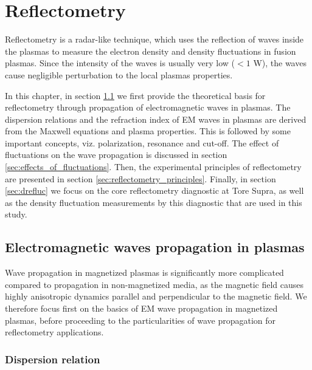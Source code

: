 
\chapter{Reflectometry} \label{ch:Reflectometry}
\graphicspath{{chapter3_ys/}}
\minitoc


Reflectometry is a radar-like technique, which uses the reflection of waves inside the plasmas to measure the electron density and density fluctuations in fusion plasmas. Since the intensity of the waves is usually very low ($< 1$ W), the waves cause negligible perturbation to the local plasmas properties.

In this chapter, in section \ref{sec:EM_waves_propagation} we first provide the theoretical basis for reflectometry through propagation of electromagnetic waves in plasmas. The dispersion relations and the refraction index of EM waves in plasmas are derived from the Maxwell equations and plasma properties. This is followed by some important concepts, viz. polarization, resonance and cut-off. The effect of fluctuations on the wave propagation is discussed in section \ref{sec:effects_of_fluctuations}. Then, the experimental principles of reflectometry are presented in section \ref{sec:reflectometry_principles}. Finally, in section \ref{sec:drefluc} we focus on the core reflectometry diagnostic at Tore Supra, as well as the density fluctuation measurements by this diagnostic that are used in this study.


\section{Electromagnetic waves propagation in plasmas} \label{sec:EM_waves_propagation}

Wave propagation in magnetized plasmas is significantly more complicated compared to propagation in non-magnetized media, as the magnetic field causes highly anisotropic dynamics parallel and perpendicular to the magnetic field. We therefore focus first on the basics of EM wave propagation in magnetized plasmas, before proceeding to the particularities of wave propagation for reflectometry applications.


\subsection{Dispersion relation} \label{sec:dispersion_relation}

